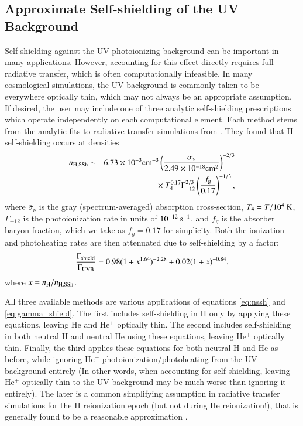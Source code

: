 \subsection{Approximate Self-shielding of the UV Background}
\label{section:UVB-self-shielding}
Self-shielding against the UV photoionizing background can be important in many applications. However, accounting for this effect directly requires full radiative transfer, which is often computationally infeasible. In many cosmological simulations, the UV background is commonly taken to be everywhere optically thin, which may not always be an appropriate assumption. If desired, the user may include one of three analytic self-shielding prescriptions which operate independently on each computational element. Each method stems from the analytic fits to radiative transfer simulations from \citet{2013MNRAS.430.2427R}. They found that H self-shielding occurs at densities
\begin{eqnarray} \label{eq:nssh}
n_{\rm{H,SSh}} & \sim & 6.73\times10^{-3} \rm{cm}^{-3} \left(\frac{\bar{\sigma}_{\nu}}{2.49\times10^{-18} \rm{cm}^{2}}\right)^{-2/3} \nonumber \\
 & & \times ~ T_{4}^{0.17} \Gamma_{-12}^{2/3} \left(\frac{f_{\rm{g}}}{0.17}\right)^{-1/3},
\end{eqnarray}
where $\bar{\sigma}_{\nu}$ is the gray (spectrum-averaged) absorption cross-section, $T_{4} = T / 10^{4} \: {\rm K}$, $\Gamma_{-12}$ is the photoionization rate in units of $10^{-12} \: {\rm s^{-1}}$, and $f_g$ is the absorber baryon fraction, which we take as $f_g = 0.17$ for simplicity. Both the ionization and photoheating rates are then attenuated due to self-shielding by a factor:
\begin{equation} \label{eq:gamma_shield}
\frac{\Gamma_{\rm{shield}}}{\Gamma_{\rm{UVB}}} = 0.98 (1 + x^{1.64})^{-2.28} + 0.02 (1 + x)^{-0.84},
\end{equation}
where $x = n_{\rm H} / n_{\rm H,SSh}$.

All three available methods are various applications of equations \ref{eq:nssh} and \ref{eq:gamma_shield}. The first includes self-shielding in H only by applying these equations, leaving He and He$^+$ optically thin. The second includes self-shielding in both neutral H and neutral He using these equations, leaving He$^+$ optically thin. Finally, the third applies these equations for both neutral H and He as before, while ignoring He$^+$ photoionization/photoheating from the UV background entirely (In other words, when accounting for self-shielding, leaving He$^+$ optically thin to the UV background may be much worse than ignoring it entirely). The later is a common simplifying assumption in radiative transfer simulations for the H reionization epoch (but not during He reionization!), that is generally found to be a reasonable approximation \citep{2006agna.book.....O, 2010MNRAS.408.1945M, 2012MNRAS.421.2232F, 2013MNRAS.430.2427R}.  

